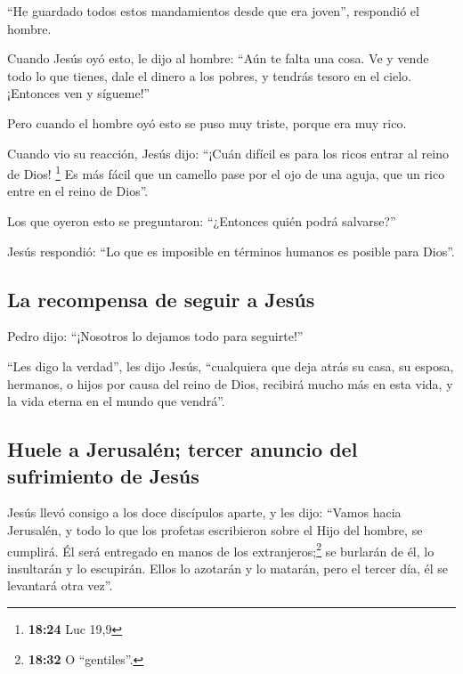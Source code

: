  ``He guardado todos estos mandamientos desde que era
joven'', respondió el hombre.

 Cuando Jesús oyó esto, le dijo al hombre: ``Aún te falta
una cosa. Ve y vende todo lo que tienes, dale el dinero a los pobres, y
tendrás tesoro en el cielo. ¡Entonces ven y sígueme!''

 Pero cuando el hombre oyó esto se puso muy triste,
porque era muy rico.

 Cuando vio su reacción, Jesús dijo: ``¡Cuán difícil es
para los ricos entrar al reino de Dios! \footnote{\textbf{18:24} Luc
  19,9}  Es más fácil que un camello pase por el ojo de
una aguja, que un rico entre en el reino de Dios''.

 Los que oyeron esto se preguntaron: ``¿Entonces quién
podrá salvarse?''

 Jesús respondió: ``Lo que es imposible en términos
humanos es posible para Dios''.

\hypertarget{la-recompensa-de-seguir-a-jesuxfas}{%
\subsection{La recompensa de seguir a
Jesús}\label{la-recompensa-de-seguir-a-jesuxfas}}

 Pedro dijo: ``¡Nosotros lo dejamos todo para seguirte!''

 ``Les digo la verdad'', les dijo Jesús, ``cualquiera que
deja atrás su casa, su esposa, hermanos, o hijos por causa del reino de
Dios,  recibirá mucho más en esta vida, y la vida eterna
en el mundo que vendrá''.

\hypertarget{huele-a-jerusaluxe9n-tercer-anuncio-del-sufrimiento-de-jesuxfas}{%
\subsection{Huele a Jerusalén; tercer anuncio del sufrimiento de
Jesús}\label{huele-a-jerusaluxe9n-tercer-anuncio-del-sufrimiento-de-jesuxfas}}

 Jesús llevó consigo a los doce discípulos aparte, y les
dijo: ``Vamos hacia Jerusalén, y todo lo que los profetas escribieron
sobre el Hijo del hombre, se cumplirá.  Él será entregado
en manos de los extranjeros;\footnote{\textbf{18:32} O ``gentiles''.} se
burlarán de él, lo insultarán y lo escupirán.  Ellos lo
azotarán y lo matarán, pero el tercer día, él se levantará otra vez''.

